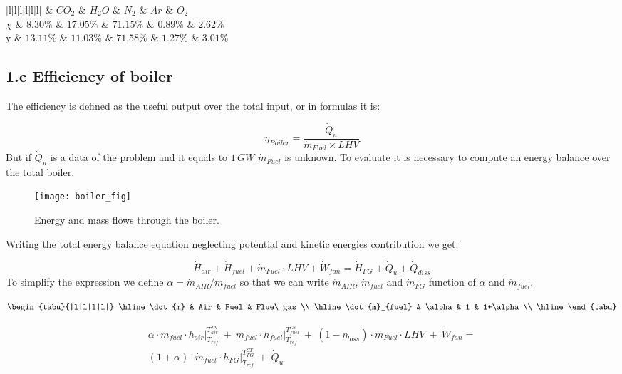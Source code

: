 \documentclass[a4paper,12pt]{article}
\begin{document}
{\begin{center}
\begin{tabu}{|l|l|l|l|l|l|}
\hline
     & $ CO_2 $ & $ H_2O $ & $ N_2 $ & $ Ar $ & $ O_2 $\\ \hline
 $\chi$ & $8.30\%$ & $17.05\%$ & $71.15\%$ & $0.89\%$ & $2.62\%$ 
  \\ \hline
y & $13.11\%$ & $11.03\%$ & $71.58\%$ & $1.27\%$ & $3.01\%$ 
 \\ \hline

\end{tabu}
\end{center}

\subsection*{1.c Efficiency of boiler} 
The efficiency is defined as the useful output over the total input, or in formulas it is:

\begin{equation} 
\label{eq:etaboiler}
\eta_{Boiler} = \frac{\dot{Q}_u}{\dot{m}_{Fuel} \times LHV}
\end{equation}
But if $\dot{Q}_u$ is a data of the problem and it equals to $1\,GW$ $\dot{m}_{Fuel}$ is unknown. To evaluate it is necessary to compute an energy balance over the total boiler.
\begin{figure}[h]
  \caption{Energy and mass flows through the boiler.}
  \centering
    \texttt{[image: boiler\_fig]}
\end{figure}

Writing the total energy balance equation neglecting potential and kinetic energies contribution we get:

\begin{equation}
\dot{H}_{air} + \dot{H}_{fuel} + \dot{m}_{Fuel} \cdot LHV
+ \dot{W}_{fan}
 = \dot{H}_{FG} + \dot{Q}_u + \dot{Q}_{diss}
\end{equation}
To simplify the expression we define 
$\alpha = \dot{m}_{AIR} / \dot{m}_{fuel}$ 
so that we can write 
$\dot{m}_{AIR}$, $\dot{m}_{fuel}$ and 
$\dot{m}_{FG}$ function of $\alpha$ and 
$\dot{m}_{fuel}$.
\begin{center}
\tabulinesep=1.2mm
$\begin{tabu}{|l|l|l|l|}
\hline
\dot{m}        & Air    & Fuel & Flue\ gas \\ \hline
\dot{m}_{fuel} & \alpha & 1    & 1+\alpha  \\ \hline
\end{tabu}$
\end{center}
\begin{equation}
\label{eq:boiler_energy_balance_NG}
\begin{split}
\alpha \cdot \dot{m}_{fuel} \cdot h_{air} \bigg\vert_{T_{ref}}^{T_{air}^{IN}}
 \ +\ 
 \dot{m}_{fuel} \cdot h_{fuel} \bigg\vert_{T_{ref}}^{T_{fuel}^{IN}} 
 \ +\  (1-\eta_{loss}) \cdot \dot{m}_{Fuel} \cdot LHV
 \ +\  \dot{W}_{fan}
 =\\
 (1+\alpha) \cdot \dot{m}_{fuel} \cdot h_{FG} \bigg\vert_{T_{ref}}^{T_{FG}^{ST}}
 \ +\  \dot{Q}_u
\end{split}
\end{equation}

}
\end{document}
